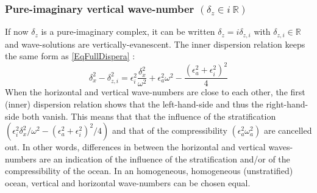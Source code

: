\documentclass[a4paper,11pt]{article}
\begin{document}
\subsubsection{Pure-imaginary vertical wave-number $(\delta_z\in i\ 
\mathbb{R})$}
\label{subsubsectioniR}

If now $\delta_z$ is a pure-imaginary complex, it can be written $\delta_z=i\delta_{z,i}$ with $\delta_{z,i}\in\mathbb{R}$ and wave-solutions are vertically-evanescent. The inner  dispersion relation keeps the same form as \ref{EqFullDispera} :
\begin{equation}
	\label{EqFullDisperai}
 		\delta_x^2-\delta_{z,i}^2 =\epsilon_i^2\frac{\delta_x^2}
 			{\omega^2}+\epsilon_a^2\omega^2-\frac{(\epsilon_a^2+\epsilon_i^2)^2}{4}
\end{equation}
When the horizontal and vertical wave-numbers are close to each other, the first (inner) dispersion relation shows that the left-hand-side and thus the right-hand-side both vanish. This means that that the influence of the stratification $(\epsilon_i^2\delta_x^2/\omega^2-(\epsilon_a^2+\epsilon_i^2)^2/4)$ and that of the compressibility $(\epsilon_a^2\omega_a^2)$ are cancelled out. In other words, differences in between the horizontal and vertical waves-numbers are an indication of the influence of the stratification and/or of the compressibility of the ocean. In an homogeneous, homogeneous (unstratified) ocean, vertical and horizontal wave-numbers can be chosen equal.\\
\end{document}
